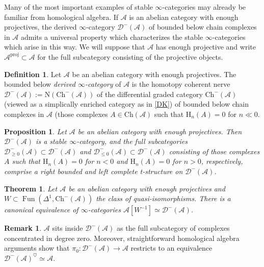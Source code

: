 \documentclass{article}
\newtheorem{theorem}{Theorem}[subsection]
\newtheorem{proposition}{Proposition}[subsection]
\theoremstyle{definition}
\newtheorem{definition}{Definition}[subsection]
\newtheorem{remark}{Remark}[subsection]
\newcommand{\A}{\mathcal{A}}
\newcommand{\D}{\mathcal{D}}
\renewcommand{\i}{\infty}
\DeclareMathOperator{\Fun}{Fun}
\DeclareMathOperator{\proj}{proj}
\begin{document}
Many of the most important examples of stable $\infty$-categories may already be familiar from homological algebra.
If ${\mathcal{A}}$ is an abelian category with enough projectives, the derived ${\infty}$-category ${\D^-(\mathcal{A})}$\index{${\D^-(\mathcal{A})}$} of bounded below chain complexes in $\A$ admits a universal property which characterizes the stable $\i$-categories which arise in this way.
We will suppose that $\A$ has enough projective and write $\A^{\proj}\subset\A$ for the full subcategory consisting of the projective objects.


\begin{definition}
Let $\A$ be an abelian category with enough projectives.
The bounded below {\em derived $\infty$-category}\index{$\D(\A)$} of $\A$ is the homotopy coherent  nerve
$
\D^-(\A):=\mathrm{N}(\mathrm{Ch}^-(\A))
$
of the differential graded category $\mathrm{Ch}^-(\A)$ (viewed as a simplically enriched category as in \autoref{DK}) of bounded below chain complexes in $\A$ (those complexes $A\in\mathrm{Ch}(\A)$ such that $\mathrm{H}_n(A)=0$ for $n\ll 0$.
\end{definition} 

\begin{proposition}{\em \cite[Corollary 1.3.2.18 and Proposition 1.3.2.19]{HA}}
Let $\A$ be an abelian category with enough projectives.
Then $\D^-(\A)$ is a stable $\i$-category, and the full subcategories $\D^-_{\geq 0}(\A)\subset\D^-(\A)$ and $\D^-_{\leq 0}(\A)\subset\D^-(\A)$ consisting of those complexes $A$ such that $\mathrm{H}_n(A)=0$ for $n<0$ and $\mathrm{H}_n(A)=0$ for $n>0$, respectively, comprise a right bounded and left complete t-structure on $\D^-(\A)$.
\end{proposition}

\begin{theorem}{\em \cite[Theorem 1.3.4.4]{HA}}
Let $\A$ be an abelian category with enough projectives and $W\subset\Fun(\Delta^1,\mathrm{Ch}^-(\A))$ the class of quasi-isomorphisms.
There is a canonical equivalence of $\i$-categories $\A[W^{-1}]\simeq\D^-(\A)$.
\end{theorem}




\begin{remark} ${\mathcal{A}}$ sits inside ${\D^-(\mathcal{A})}$ as the full subcategory of complexes concentrated in degree zero.
Moreover, straightforward homological algebra arguments show that $\pi_0: \D^-(\mathcal{A}) \rightarrow \mathcal{A}$ restricts to an equivalence $\D^-(\A)^{\heartsuit}\simeq\A$.
\end{remark}
\end{document}
